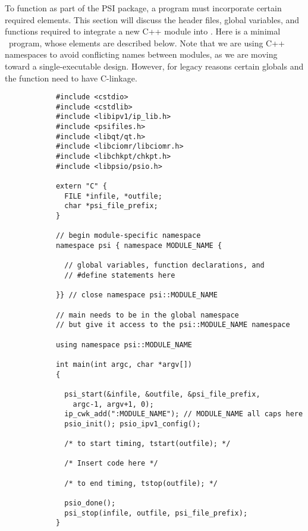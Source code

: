 %
%
%
%

To function as part of the PSI package, a program must incorporate
certain required elements.  This section will discuss the header files,
global variables, and functions required to integrate a new C++ module
into \PSIthree.  Here is a minimal \PSIthree\ program, whose elements
are described below.  Note that we are using C++ namespaces to avoid
conflicting names between modules, as we are moving toward a
single-executable design.  However, for legacy reasons certain globals and
the  function need to have C-linkage.

\begin{verbatim}
            #include <cstdio>
            #include <cstdlib>
            #include <libipv1/ip_lib.h>
            #include <psifiles.h>
            #include <libqt/qt.h>
            #include <libciomr/libciomr.h>
            #include <libchkpt/chkpt.h>
            #include <libpsio/psio.h>

            extern "C" {
              FILE *infile, *outfile;
              char *psi_file_prefix;
            }

            // begin module-specific namespace
            namespace psi { namespace MODULE_NAME {

              // global variables, function declarations, and
              // #define statements here

            }} // close namespace psi::MODULE_NAME

            // main needs to be in the global namespace
            // but give it access to the psi::MODULE_NAME namespace

            using namespace psi::MODULE_NAME

            int main(int argc, char *argv[])
            {

              psi_start(&infile, &outfile, &psi_file_prefix, 
                argc-1, argv+1, 0);
              ip_cwk_add(":MODULE_NAME"); // MODULE_NAME all caps here
              psio_init(); psio_ipv1_config();

              /* to start timing, tstart(outfile); */
                
              /* Insert code here */

              /* to end timing, tstop(outfile); */

              psio_done();
              psi_stop(infile, outfile, psi_file_prefix);
            }


\end{verbatim}
